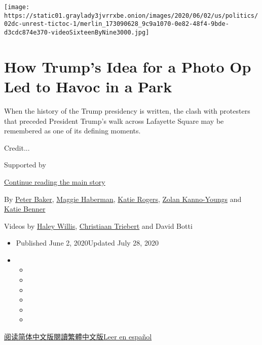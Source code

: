 \texttt{[image: https://static01.graylady3jvrrxbe.onion/images/2020/06/02/us/politics/02dc-unrest-tictoc-1/merlin\_173090628\_9c9a1070-0e82-48f4-9bde-d3cdc874e370-videoSixteenByNine3000.jpg]}

\hypertarget{how-trumps-idea-for-a-photo-op-led-to-havoc-in-a-park}{%
\section{How Trump's Idea for a Photo Op Led to Havoc in a
Park}\label{how-trumps-idea-for-a-photo-op-led-to-havoc-in-a-park}}

When the history of the Trump presidency is written, the clash with
protesters that preceded President Trump's walk across Lafayette Square
may be remembered as one of its defining moments.

Credit...

Supported by

\protect\hyperlink{after-sponsor}{Continue reading the main story}

By \href{https://www.nytimes3xbfgragh.onion/by/peter-baker}{Peter
Baker},
\href{https://www.nytimes3xbfgragh.onion/by/maggie-haberman}{Maggie
Haberman},
\href{https://www.nytimes3xbfgragh.onion/by/katie-rogers}{Katie Rogers},
\href{https://www.nytimes3xbfgragh.onion/by/zolan-kanno-youngs}{Zolan
Kanno-Youngs} and
\href{https://www.nytimes3xbfgragh.onion/by/katie-benner}{Katie Benner}

Videos by
\href{https://www.nytimes3xbfgragh.onion/by/haley-willis}{Haley Willis},
\href{http://nytimes3xbfgragh.onion/by/christiaan-triebert}{Christiaan
Triebert} and David Botti

\begin{itemize}
\item
  Published June 2, 2020Updated July 28, 2020
\item
  \begin{itemize}
  \item
  \item
  \item
  \item
  \item
  \item
  \end{itemize}
\end{itemize}

\href{https://cn.nytimes3xbfgragh.onion/usa/20200603/trump-walk-lafayette-square/}{阅读简体中文版}\href{https://cn.nytimes3xbfgragh.onion/usa/20200603/trump-walk-lafayette-square/zh-hant/}{閱讀繁體中文版}\href{https://www.nytimes3xbfgragh.onion/es/2020/06/03/espanol/mundo/trump-foto-iglesia-protestas.html}{Leer
en español}

